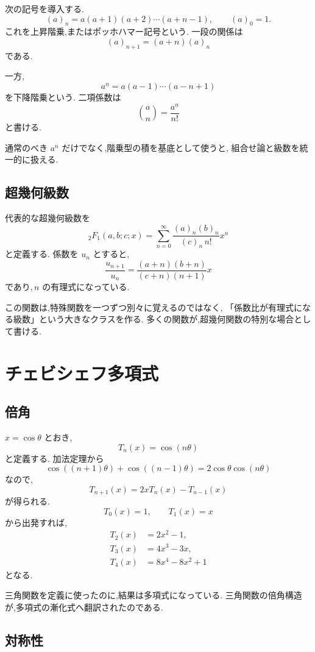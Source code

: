 次の記号を導入する.
\[
  (a)_n=a(a+1)(a+2)\cdots(a+n-1),
  \qquad (a)_0=1.
\]
これを上昇階乗,またはポッホハマー記号という.
一段の関係は
\[
  (a)_{n+1}=(a+n)(a)_n
\]
である.

一方,
\[
  a^{\underline n}
  =a(a-1)\cdots(a-n+1)
\]
を下降階乗という.
二項係数は
\[
  \binom{a}{n}
  =\frac{a^{\underline n}}{n!}
\]
と書ける.

通常のべき $a^n$ だけでなく,階乗型の積を基底として使うと,
組合せ論と級数を統一的に扱える.

\subsection{超幾何級数}

代表的な超幾何級数を
\[
  {}_2F_1(a,b;c;x)
  =
  \sum_{n=0}^{\infty}
  \frac{(a)_n(b)_n}{(c)_n\,n!}x^n
\]
と定義する.
係数を $u_n$ とすると,
\[
  \frac{u_{n+1}}{u_n}
  =
  \frac{(a+n)(b+n)}{(c+n)(n+1)}x
\]
であり,\,$n$ の有理式になっている.

この関数は,特殊関数を一つずつ別々に覚えるのではなく,
「係数比が有理式になる級数」という大きなクラスを作る.
多くの関数が,超幾何関数の特別な場合として書ける.

\section{チェビシェフ多項式}

\subsection{倍角}

$x=\cos\theta$ とおき,
\[
  T_n(x)=\cos(n\theta)
\]
と定義する.
加法定理から
\[
  \cos((n+1)\theta)
  +\cos((n-1)\theta)
  =2\cos\theta\cos(n\theta)
\]
なので,
\[
  T_{n+1}(x)=2xT_n(x)-T_{n-1}(x)
\]
が得られる.
\[
  T_0(x)=1,\qquad T_1(x)=x
\]
から出発すれば,
\[
\begin{align*}
  T_2(x)&=2x^2-1,\\
  T_3(x)&=4x^3-3x,\\
  T_4(x)&=8x^4-8x^2+1
\end{align*}
\]
となる.

三角関数を定義に使ったのに,結果は多項式になっている.
三角関数の倍角構造が,多項式の漸化式へ翻訳されたのである.

\subsection{対称性}

